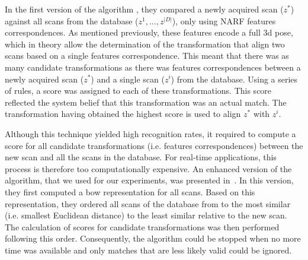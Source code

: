 In the first version of the algorithm \citep{Steder2010}, they compared a newly acquired scan ($z^*$) against all scans from the database ($z^1,...,z^{|D|}$), only using NARF features correspondences. As mentioned previously, these features encode a full \gls*{3d} pose, which in theory allow the determination of the transformation that align two scans based on a single features correspondence. This meant that there was as many candidate transformations as there was features correspondences between a newly acquired scan ($z^*$) and a single scan ($z^i$) from the database. Using a series of rules, a score was assigned to each of these transformations. This score reflected the system belief that this transformation was an actual match. The transformation having obtained the highest score is used to align $z^*$ with $z^i$.

Although this technique yielded high recognition rates, it required to compute a score for all candidate transformations (i.e. features correspondences) between the new scan and all the scans in the database. For real-time applications, this process is therefore too computationally expensive. An enhanced version of the algorithm, that we used for our experiments, was presented in~\cite{Steder2011b}. In this version, they first computed a \gls*{bow} representation for all scans. Based on this representation, they ordered all scans of the database from to the most similar (i.e. smallest Euclidean distance) to the least similar relative to the new scan. The calculation of scores for candidate transformations was then performed following this order. Consequently, the algorithm could be stopped when no more time was available and only matches that are less likely valid could be ignored. 


